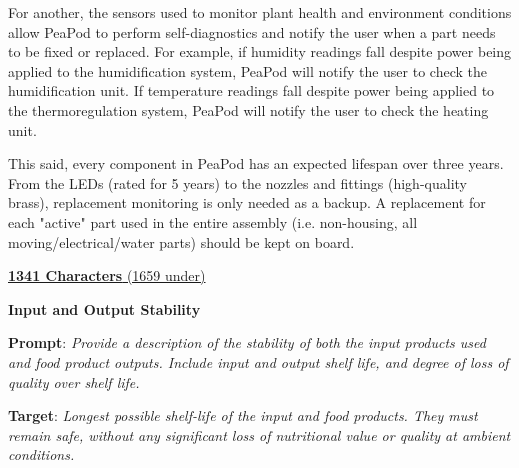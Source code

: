 \documentclass{report}
\begin{document}
For another, the sensors used to monitor plant health and environment conditions allow PeaPod to perform self-diagnostics and notify the user when a part needs to be fixed or replaced. For example, if humidity readings fall despite power being applied to the humidification system, PeaPod will notify the user to check the humidification unit. If temperature readings fall despite power being applied to the thermoregulation system, PeaPod will notify the user to check the heating unit.

This said, every component in PeaPod has an expected lifespan over three years. From the LEDs (rated for 5 years) to the nozzles and fittings (high-quality brass), replacement monitoring is only needed as a backup. A replacement for each "active" part used in the entire assembly (i.e. non-housing, all moving/electrical/water parts) should be kept on board.

\uline{\textbf{1341 Characters} (1659 under)}


\vspace{0.5cm}

\textbf{Input and Output Stability}
\label{sec:reliability-inputoutput}

\textbf{Prompt}: \textit{Provide a description of the stability of both the input products used and food product outputs. Include input and output shelf life, and degree of loss of quality over shelf life.}

\textbf{Target}: \textit{Longest possible shelf-life of the input and food products. They must remain safe, without any significant loss of nutritional value or quality at ambient conditions.}
\end{document}
